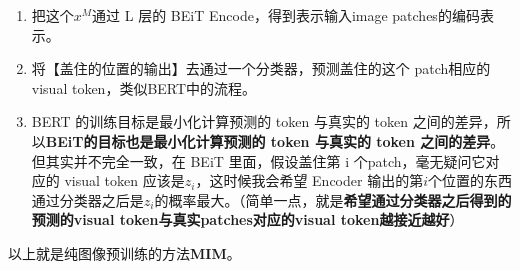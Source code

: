 \documentclass[zihao=false,fontset=windows]{ctexart}
\newcommand{\redb}[1]{\textcolor{feishuRed}{\textbf{#1}}}
\begin{document}
\begin{enumerate}
\item 把这个$x^M$通过 L 层的 BEiT Encode，得到表示输入image patches的编码表示。
\item 将【盖住的位置的输出】去通过一个分类器，预测盖住的这个 patch相应的 visual token，类似BERT中的流程。
\item BERT 的训练目标是最小化计算预测的 token 与真实的 token 之间的差异，所以\textbf{BEiT的目标也是最小化计算预测的 token 与真实的 token 之间的差异}。但其实并不完全一致，在 BEiT 里面，假设盖住第 i 个patch，毫无疑问它对应的 visual token 应该是$z_i$，这时候我会希望 Encoder 输出的第$i$个位置的东西通过分类器之后是$z_i$的概率最大。（简单一点，就是\textbf{希望通过分类器之后得到的预测的visual token与真实patches对应的visual token越接近越好}）
\end{enumerate}
以上就是纯图像预训练的方法\redb{MIM}。\par
\end{document}
